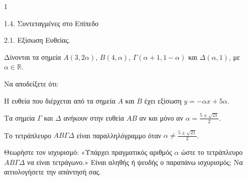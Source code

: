 \begin{ylh}{1}
    \item 1.4. Συντεταγμένες στο Επίπεδο
    \item 2.1. Εξίσωση Ευθείας.
\end{ylh}
Δίνονται τα σημεία $A(3, 2\alpha)$, $B(4, \alpha)$, $\Gamma(\alpha + 1, 1 - \alpha)$ και $\Delta(\alpha, 1)$, με $\alpha \in \mathbb{R}$.
\begin{alist}
\item Να αποδείξετε ότι:
    \begin{rlist}
    \item Η ευθεία που διέρχεται από τα σημεία $A$ και $B$ έχει εξίσωση $y = -\alpha x + 5\alpha$. 
    \item Τα σημεία $\Gamma$ και $\Delta$ ανήκουν στην ευθεία $AB$ αν και μόνο αν $\alpha = \frac{5 \pm \sqrt{21}}{2}$. 
    \item Το τετράπλευρο $AB\Gamma\Delta$ είναι παραλληλόγραμμο όταν $\alpha \ne \frac{5 \pm \sqrt{21}}{2}$. 
    \end{rlist}
\item Θεωρήστε τον ισχυρισμό: «Υπάρχει πραγματικός αριθμός $\alpha$ ώστε το τετράπλευρο $AB\Gamma\Delta$ να είναι τετράγωνο.» Είναι αληθής ή ψευδής ο παραπάνω ισχυρισμός; Να αιτιολογήσετε την απάντησή σας. 
\end{alist}
